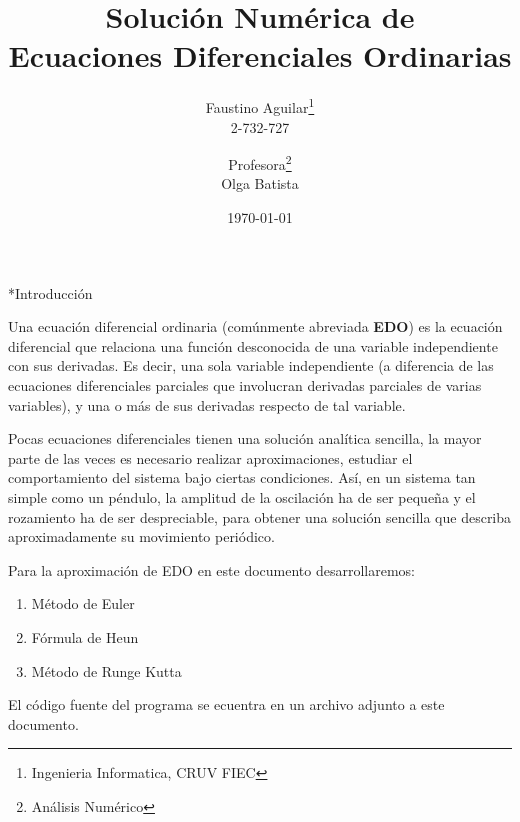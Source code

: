 \documentclass[letterpaper, 12pt]{article}
\title{\textbf{Solución Numérica de\\Ecuaciones Diferenciales Ordinarias}}
\author{Faustino Aguilar\footnote{Ingenieria Informatica, CRUV FIEC}\\2-732-727 \and Profesora\footnote{Análisis Numérico}\\Olga Batista}
\date{\today}
\begin{document}
  \maketitle
  \thispagestyle{first}
  \newpage
  \tableofcontents
  \thispagestyle{first}
  \newpage
  \begin{section}*{Introducción}
    \thispagestyle{first}
    Una ecuación diferencial ordinaria (comúnmente abreviada  \textbf{EDO}) es la ecuación diferencial que relaciona una función desconocida de una variable independiente con sus derivadas. Es decir, una sola variable independiente (a diferencia de las ecuaciones diferenciales parciales que involucran derivadas parciales de varias variables), y una o más de sus derivadas respecto de tal variable.

    Pocas ecuaciones diferenciales tienen una solución analítica sencilla, la mayor parte de las veces es necesario realizar aproximaciones, estudiar el comportamiento del sistema bajo ciertas condiciones. Así, en un sistema tan simple como un péndulo, la amplitud de la oscilación ha de ser pequeña y el rozamiento ha de ser despreciable, para obtener una solución sencilla que describa aproximadamente su movimiento periódico.

    Para la aproximación de EDO en este documento desarrollaremos:

    \begin{enumerate}
      \item Método de Euler
      \item Fórmula de Heun
      \item Método de Runge Kutta
    \end{enumerate}

    El código fuente del programa se ecuentra en un archivo adjunto a este documento.
  \end{section}
  \newpage
\end{document}
